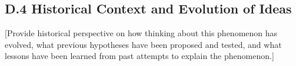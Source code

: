 \documentclass[11pt,letterpaper]{article}
\begin{document}
\subsection*{D.4 Historical Context and Evolution of Ideas}

[Provide historical perspective on how thinking about this phenomenon has evolved, what previous hypotheses have been proposed and tested, and what lessons have been learned from past attempts to explain the phenomenon.]

\newpage



%
%
%
%
\end{document}
